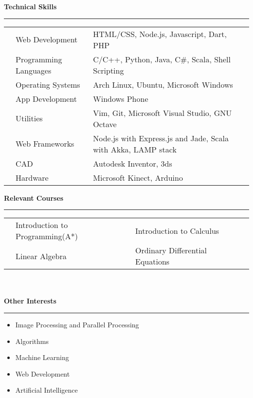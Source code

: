 \documentclass[11pt,a4paper]{article}
\begin{document}
\textbf{\Large{Technical Skills}}\\
\rule{\textwidth}{01pt}
\begin{tabular}{L{0.05cm} L{5cm} l}
&Web Development 	        &HTML/CSS, Node.js, Javascript, Dart, PHP \\
&Programming Languages      &C/C++, Python, Java, C\#, Scala, Shell Scripting\\
&Operating Systems	        &Arch Linux, Ubuntu, Microsoft Windows\\
&App Development		    &Windows Phone\\
&Utilities                  &Vim, Git, Microsoft Visual Studio, GNU Octave\\
&Web Frameworks             &Node.js with Express.js and Jade, Scala with Akka, LAMP stack\\
&CAD	                	&Autodesk Inventor, 3ds\\
&Hardware                   &Microsoft Kinect, Arduino\\

\end{tabular}
\vspace{6mm}



\textbf{\Large{Relevant Courses}} \\
\rule{\textwidth}{01pt}
\begin{tabular}{L{0.05cm} L{6cm} L{5.5cm} L{5.5cm}}
& Introduction to Programming(A*)   & Introduction to Calculus        \\
& Linear Algebra                    & Ordinary Differential  Equations\\
\end{tabular}\\\\




\textbf{\Large{Other Interests}}\\
\rule{\textwidth}{01pt}

\begin {itemize}
\setlength\itemsep{0em}		%
\item Image Processing and Parallel Processing
\item Algorithms
\item Machine Learning
\item Web Development
\item Artificial Intelligence
\end{itemize}

\
\end{document}

